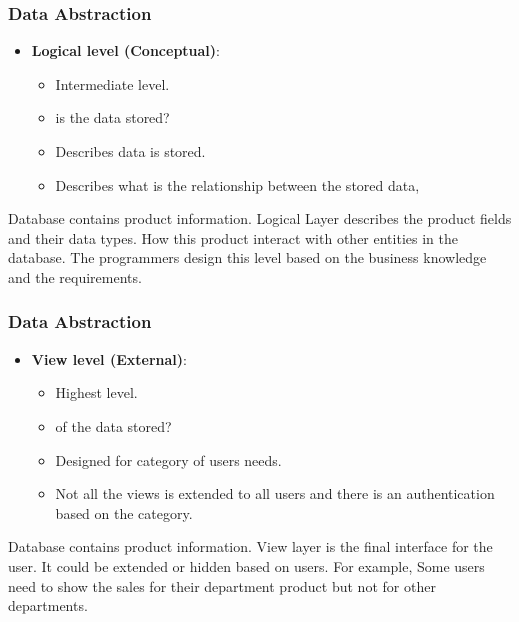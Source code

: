 \begin{frame}
	\frametitle{Data Abstraction}
	\begin{itemize}[<+->]
		\item \textbf{Logical level (Conceptual)}: 
		\begin{itemize}[<+->]
			\item Intermediate level.
			\item \textbf{\underline{}} is the data stored?  
			\item Describes \textbf{\underline{}} data is stored.
			\item Describes what is the relationship between the stored data,
		\end{itemize}		
	\end{itemize}	
		\begin{example}
		Database contains product information. Logical Layer describes the product fields and their data types. How this product interact with other entities in the database. The programmers design this level based on the business knowledge and the requirements.
		\end{example}
	
\end{frame}
\begin{frame}
	\frametitle{Data Abstraction}
	\begin{itemize}[<+->]
		\item \textbf{View level (External)}: 
		\begin{itemize}[<+->]
			\item Highest level.
			\item \textbf{\underline{}} of the data stored?  
			\item Designed for category of users needs.
			\item Not all the views is extended to all users and there is an authentication based on the category.
		\end{itemize}		
	\end{itemize}	
	\begin{example}
		Database contains product information. View layer is the final interface for the user. It could be extended or hidden based on users. For example, Some users need to show the sales for their department product but not for other departments.
	\end{example}
	
\end{frame}

